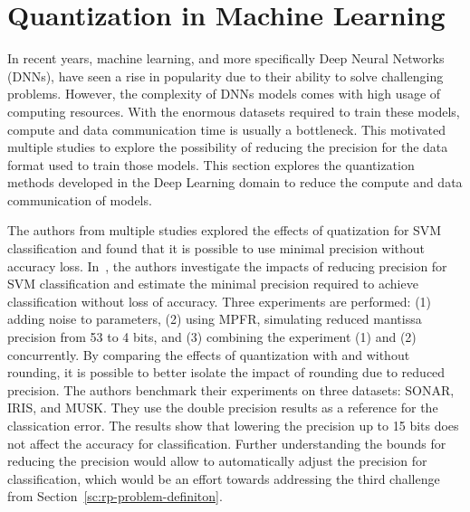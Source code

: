 \section{Quantization in Machine Learning}
In recent years, machine learning, and more specifically Deep Neural Networks (DNNs),
have seen a rise in popularity due to their ability to solve challenging problems.
However, the complexity of DNNs models comes with high usage of computing resources.
With the enormous datasets required to train these models, compute and data communication time is usually a bottleneck.
This motivated multiple studies \cite{Johnson2018-up,Wang2018-oo,Lesser2011-mn,Chen2018-an,Judd2015-kw,Vicuna2021-mw}
to explore the possibility of reducing the precision for the data format used to train those models.
This section explores the quantization methods developed in the Deep Learning 
domain to reduce the compute and data communication of models.

The authors from multiple studies explored the effects of quatization for SVM classification
and found that it is possible to use minimal precision without accuracy loss.
In~\cite{Lesser2011-mn}, the authors investigate the impacts of reducing precision for SVM
classification and estimate the minimal precision required to achieve classification 
without loss of accuracy. Three experiments are performed: 
(1) adding noise to parameters,
(2) using MPFR, simulating reduced mantissa precision from 53 to 4 bits,
and (3) combining the experiment (1) and (2) concurrently.
By comparing the effects of quantization with and without rounding, it is possible to
better isolate the impact of rounding due to reduced precision.
The authors benchmark their experiments on three datasets: SONAR, IRIS, and MUSK.
They use the double precision results as a reference for the classication error.
The results show that lowering the precision up to 15 bits does not affect the accuracy
for classification.
Further understanding the bounds for reducing the precision would allow to automatically
adjust the precision for classification, which would be an effort towards addressing the third 
challenge from Section~\ref{sc:rp-problem-definiton}.

